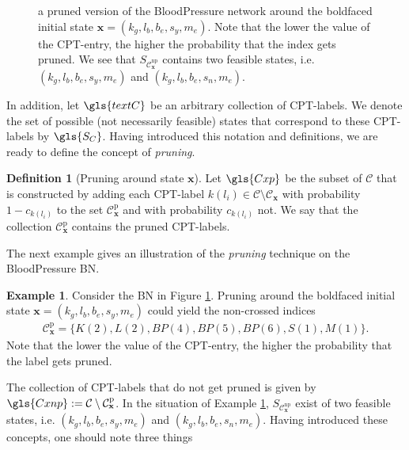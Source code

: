 \documentclass[a4paper, twoside, 11pt]{report}
\newcommand{\bfx}{{\mathbf{x}}}
\newcommand{\C}{{\mathcal C}}
\theoremstyle{plain}
\theoremstyle{definition}
\newtheorem{definition}[thm]{Definition}
\newtheorem{example}[thm]{Example}
\theoremstyle{remark}
\begin{document}
\begin{figure}[t!]
\begin{adjustbox}{width=\textwidth}
\end{adjustbox}
\caption{a pruned version of the BloodPressure network around the boldfaced initial state $\bfx = (k_g, l_b, b_e, s_y, m_e)$. Note that the lower the value of the CPT-entry, the higher the probability that the index gets pruned. We see that $S_{\C_\bfx^{\text{np}}}$ contains two feasible states, i.e. $(k_g, l_b, b_e, s_y, m_e)$ and $(k_g, l_b, b_e, s_n, m_e)$.}
\label{pruning}
\end{figure}
In addition, let $\gls{textC}$ be an arbitrary collection of CPT-labels. We denote the set of possible (not necessarily feasible) states that correspond to these CPT-labels by $\gls{S_C}$. Having introduced this notation and definitions, we are ready to define the concept of \textit{pruning}.
\begin{definition}[Pruning around state $\bfx$]\label{prunedef}
Let $\gls{Cxp}$ be the subset of $\C$ that is constructed by adding each CPT-label $k(l_i) \in \C \setminus \C_{\bfx}$ with probability $1-c_{k(l_i)}$ to the set $\C_\bfx^{\text{p}}$ and with probability $c_{k(l_i)}$ not. We say that the collection $\C_\bfx^{\text{p}}$ contains the pruned CPT-labels. 
\end{definition}
The next example gives an illustration of the \textit{pruning} technique on the BloodPressure BN.
\begin{example}\label{ex:pruning}
Consider the BN in Figure \ref{pruning}. Pruning around the boldfaced initial state $\bfx = (k_g, l_b, b_e, s_y, m_e)$ could yield the non-crossed indices 
\begin{align*}
\C_\bfx^{\text{p}} = \{ K(2), L(2), BP(4), BP(5), BP(6), S(1), M(1) \}.
\end{align*}
Note that the lower the value of the CPT-entry, the higher the probability that the label gets pruned. 
\end{example}
The collection of CPT-labels that do not get pruned is given by $\gls{Cxnp}:=\C \setminus \C_\bfx^{\text{p}}$. In the situation of Example \ref{ex:pruning}, $S_{\C_\bfx^{\text{np}}}$ exist of two feasible states, i.e. $(k_g, l_b, b_e, s_y, m_e)$ and $(k_g, l_b, b_e, s_n, m_e)$. Having introduced these concepts, one should note three things
\end{document}
